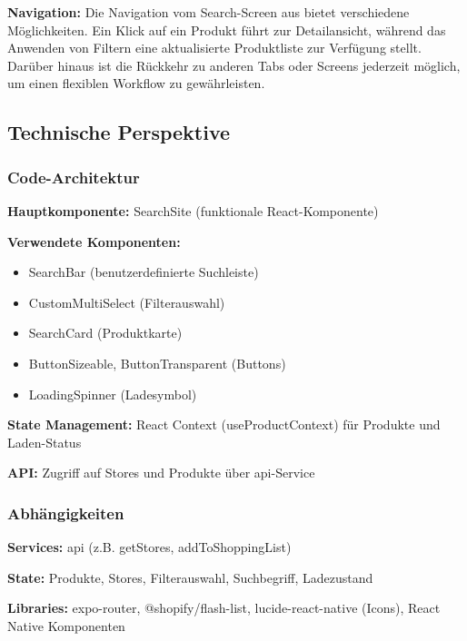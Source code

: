 \noindent\textbf{Navigation:}
Die Navigation vom Search-Screen aus bietet verschiedene Möglichkeiten. Ein Klick auf ein Produkt führt zur Detailansicht, während das Anwenden von Filtern eine aktualisierte Produktliste zur Verfügung stellt. Darüber hinaus ist die Rückkehr zu anderen Tabs oder Screens jederzeit möglich, um einen flexiblen Workflow zu gewährleisten.

\subsection{Technische Perspektive}

\subsubsection{Code-Architektur}

\textbf{Hauptkomponente:} SearchSite (funktionale React-Komponente)

\noindent\textbf{Verwendete Komponenten:}
\begin{itemize}
    \item SearchBar (benutzerdefinierte Suchleiste)
    \item CustomMultiSelect (Filterauswahl)
    \item SearchCard (Produktkarte)
    \item ButtonSizeable, ButtonTransparent (Buttons)
    \item LoadingSpinner (Ladesymbol)
\end{itemize}

\noindent\textbf{State Management:} React Context (useProductContext) für Produkte und Laden-Status

\noindent\textbf{API:} Zugriff auf Stores und Produkte über api-Service

\subsubsection{Abhängigkeiten}

\textbf{Services:} api (z.B. getStores, addToShoppingList)

\noindent\textbf{State:} Produkte, Stores, Filterauswahl, Suchbegriff, Ladezustand

\noindent\textbf{Libraries:} expo-router, @shopify/flash-list, lucide-react-native (Icons), React Native Komponenten

